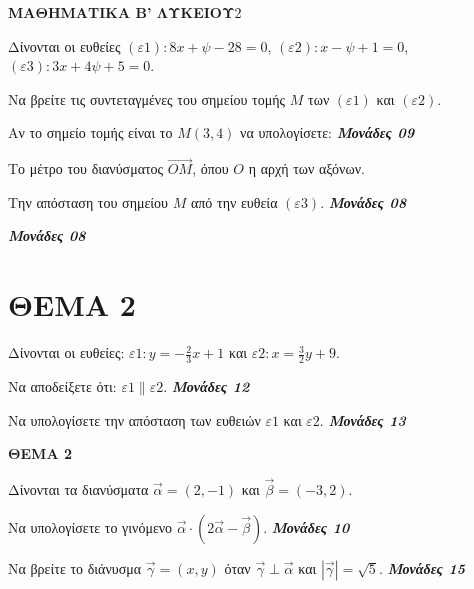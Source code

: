 \documentclass[11pt,a4paper,twoside]{book}
\newcommand{\OnPar}[1]{{\notoserif\bfseries\fontsize{18}{22}\selectfont #1}}
\newcommand{\Askhseis}[1]{{\urwgothic\bfseries\fontsize{16}{19}\selectfont #1}}
\newcommand{\monades}[1]{
\hspace*{\fill}
\textbf{\textit{\textcolor{maincolor}{Μονάδες #1}}}}
\begin{document}
\vspace{4mm}

\Askhseis{ΜΑΘΗΜΑΤΙΚΑ Β' ΛΥΚΕΙΟΥ}{2}

Δίνονται οι ευθείες $(\varepsilon1) : 8x + \psi - 28 = 0$, $(\varepsilon2) : x - \psi + 1 = 0$, $(\varepsilon3) : 3x + 4\psi + 5 = 0$.

\begin{alist}    \item Να βρείτε τις συντεταγμένες του σημείου τομής $M$ των $(\varepsilon1)$ και $(\varepsilon2)$.
    \item Αν το σημείο τομής είναι το $M(3,4)$ να υπολογίσετε:  \monades{09}
    \begin{rlist}
        \item Το μέτρο του διανύσματος $\overrightarrow{OM}$, όπου $O$ η αρχή των αξόνων.

        \item Την απόσταση του σημείου $M$ από την ευθεία $(\varepsilon3)$.  \monades{08}
 \monades{08}
    \end{rlist}\end{alist}

\vspace{4mm}

\section*{ΘΕΜΑ 2}

Δίνονται οι ευθείες: $\varepsilon1: y = -\frac{2}{3}x + 1$ και $\varepsilon2: x = \frac{3}{2}y + 9$.

\begin{alist}    \item Να αποδείξετε ότι: $\varepsilon1 \parallel \varepsilon2$. \monades{12}
    \item Να υπολογίσετε την απόσταση των ευθειών $\varepsilon1$ και $\varepsilon2$. \monades{13}\end{alist}

\vspace{4mm}

\OnPar{ΘΕΜΑ 2}

Δίνονται τα διανύσματα $\vec{\alpha} = (2, -1)$ και $\vec{\beta} = (-3, 2)$.
\begin{alist}    \item Να υπολογίσετε το γινόμενο $\vec{\alpha} \cdot (2\vec{\alpha} - \vec{\beta})$. \monades{10}
    \item Να βρείτε το διάνυσμα $\vec{\gamma} = (x, y)$ όταν $\vec{\gamma} \perp \vec{\alpha}$ και $|\vec{\gamma}| = \sqrt{5}$. \monades{15}\end{alist}
\end{document}
